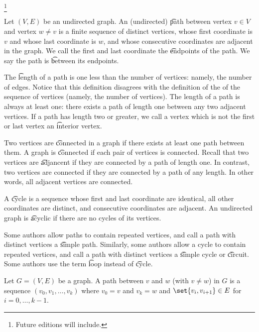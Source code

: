 
\footnote{Future editions will include.}


Let $(V, E)$ be an undirected graph.
An (undirected) \t{path} between vertex $v \in V$ and vertex $w \neq v$ is a finite sequence of distinct vertices, whose first coordinate is $v$ and whose last coordinate is $w$, and whose consecutive coordinates are adjacent in the graph.
We call the first and last coordinate the \t{endpoints} of the path.
We say the path is \t{between} its endpoints.

The \t{length} of a path is one less than the number of vertices: namely, the number of edges.
Notice that this definition disagrees with the definition of the  of the sequence of vertices (namely, the number of vertices).
The length of a path is always at least one: there exists a path of length one between any two adjacent vertices.
If a path has length two or greater, we call a vertex which is not the first or last vertex an \t{interior vertex}.

Two vertices are \t{connected} in a graph if there exists at least one path between them.
A graph is \t{connected} if each pair of vertices is connected.
Recall that two vertices are \t{adjancent} if they are connected by a path of length one.
In contrast, two vertices are connected if they are connected by a path of any length.
In other words, all adjacent vertices are connected.

A \t{cycle} is a sequence whose first and last coordinate are identical, all other coordinates are distinct, and consecutive coordinates are adjacent.
An undirected graph is \t{acyclic} if there are no cycles of its vertices.


Some authors allow paths to contain repeated vertices, and call a path with distinct vertices a \t{simple path}.
Similarly, some authors allow a cycle to contain repeated vertices, and call a path with distinct vertices a \t{simple cycle} or \t{circuit}.
Some authors use the term \t{loop} instead of \t{cycle}.


Let $G = (V, E)$ be a graph.
A path between $v$ and $w$ (with $v \neq w$) in $G$ is a sequence $(v_0, v_1, \dots, v_k)$ where $v_0 = v$ and $v_k = w$ and $\set{v_i, v_{i+1}} \in E$ for $i = 0, \dots, k-1$.

